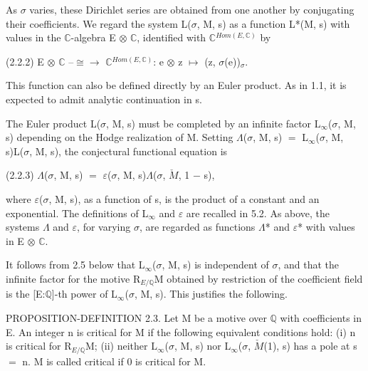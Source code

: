 \documentclass[10pt,twoside]{article}
\begin{document}
As \ensuremath{σ} varies, these Dirichlet series are obtained from one another by conjugating their coefficients. We regard the system L(\ensuremath{σ}, M, s) as a function L*(M, s) with values in the \ensuremath{ℂ}-algebra E \ensuremath{⊗} \ensuremath{ℂ}, identified with \ensuremath{ℂ}\ensuremath{^{Hom(E,ℂ)}} by\par
(2.2.2)    E \ensuremath{⊗} \ensuremath{ℂ} --\ensuremath{≅}\ensuremath{→} \ensuremath{ℂ}\ensuremath{^{Hom(E,ℂ)}}: e \ensuremath{⊗} z \ensuremath{↦} (z, \ensuremath{σ}(e))\ensuremath{_{σ}}.\par
This function can also be defined directly by an Euler product. As in 1.1, it is expected to admit analytic continuation in s.\par
The Euler product L(\ensuremath{σ}, M, s) must be completed by an infinite factor L\ensuremath{_{∞}}(\ensuremath{σ}, M, s) depending on the Hodge realization of M. Setting \ensuremath{Λ}(\ensuremath{σ}, M, s) \ensuremath{=} L\ensuremath{_{∞}}(\ensuremath{σ}, M, s)L(\ensuremath{σ}, M, s), the conjectural functional equation is\par
(2.2.3)    \ensuremath{Λ}(\ensuremath{σ}, M, s) \ensuremath{=} \ensuremath{ε}(\ensuremath{σ}, M, s)\ensuremath{Λ}(\ensuremath{σ}, \ensuremath{\check{M}}, 1 \ensuremath{−} s),\par
where \ensuremath{ε}(\ensuremath{σ}, M, s), as a function of s, is the product of a constant and an exponential. The definitions of L\ensuremath{_{∞}} and \ensuremath{ε} are recalled in 5.2. As above, the systems \ensuremath{Λ} and \ensuremath{ε}, for varying \ensuremath{σ}, are regarded as functions \ensuremath{Λ}* and \ensuremath{ε}* with values in E \ensuremath{⊗} \ensuremath{ℂ}.\par
It follows from 2.5 below that L\ensuremath{_{∞}}(\ensuremath{σ}, M, s) is independent of \ensuremath{σ}, and that the infinite factor for the motive R\ensuremath{_{E/ℚ}}M obtained by restriction of the coefficient field is the [E:\ensuremath{ℚ}]-th power of L\ensuremath{_{∞}}(\ensuremath{σ}, M, s). This justifies the following.\par
PROPOSITION-DEFINITION 2.3. Let M be a motive over \ensuremath{ℚ} with coefficients in E. An integer n is critical for M if the following equivalent conditions hold: (i) n is critical for R\ensuremath{_{E/ℚ}}M; (ii) neither L\ensuremath{_{∞}}(\ensuremath{σ}, M, s) nor L\ensuremath{_{∞}}(\ensuremath{σ}, \ensuremath{\check{M}}(1), s) has a pole at s \ensuremath{=} n. M is called critical if 0 is critical for M.\par
\end{document}
